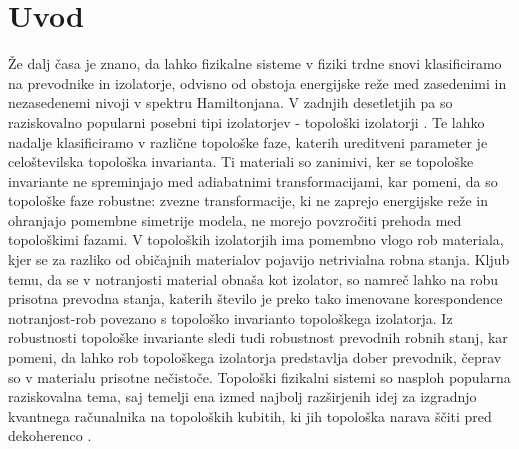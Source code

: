 
\cleardoublepage
\tableofcontents


\pagestyle{fancy}
\fancyhead[CE,RE]{}
\fancyhead[LO,CO]{}
\fancyhead[LE]{\textbf{\nouppercase{\leftmark}}}
\fancyhead[RO]{\textbf{\nouppercase{\rightmark}}}

%

\chapter{Uvod}
\label{chUv}
Že dalj časa je znano, da lahko fizikalne sisteme v fiziki trdne snovi klasificiramo na prevodnike in izolatorje, odvisno od obstoja energijske reže med zasedenimi in nezasedenemi nivoji v spektru Hamiltonjana. V zadnjih desetletjih pa so raziskovalno popularni posebni tipi izolatorjev - topološki izolatorji \cite{madzar, yoichi}. Te lahko nadalje klasificiramo v različne topološke faze, katerih ureditveni parameter je celoštevilska topološka invarianta. Ti materiali so zanimivi, ker se topološke invariante ne spreminjajo med adiabatnimi transformacijami, kar pomeni, da so topološke faze robustne: zvezne transformacije, ki ne zaprejo energijske reže in ohranjajo pomembne simetrije modela, ne morejo povzročiti prehoda med topološkimi fazami. V topoloških izolatorjih ima pomembno vlogo rob materiala, kjer se za razliko od običajnih materialov pojavijo netrivialna robna stanja. Kljub temu, da se v notranjosti material obnaša kot izolator, so namreč lahko na robu prisotna prevodna stanja, katerih število je preko tako imenovane korespondence notranjost-rob povezano s topološko invarianto topološkega izolatorja. Iz robustnosti topološke invariante sledi tudi robustnost prevodnih robnih stanj, kar pomeni, da lahko rob topološkega izolatorja predstavlja dober prevodnik, čeprav so v materialu prisotne nečistoče. Topološki fizikalni sistemi so nasploh popularna raziskovalna tema, saj temelji ena izmed najbolj razširjenih idej za izgradnjo kvantnega računalnika na topoloških kubitih, ki jih topološka narava ščiti pred dekoherenco \cite{computer}.

